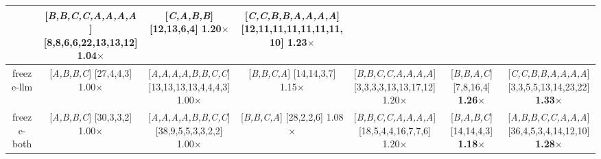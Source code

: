\begin{table}[htbp]
{\begin{tabular}{ccccccc}
    \rule{0pt}{20pt} & \makecell{[\textit{B,B,C,C,A,A,A,A}]\\{[8,8,6,6,22,13,13,12]}\\1.04$\times$}
    \rule{0pt}{20pt} & \makecell{[\textit{C,A,B,B}]\\{[12,13,6,4]}\\ \textbf{1.20$\times$}}
    \rule{0pt}{20pt} & \makecell{[\textit{C,C,B,B,A,A,A,A}]\\{[12,11,11,11,11,11,11,10]}\\ \textbf{1.23$\times$}} \\
    \hline
    freeze-llm
    \rule{0pt}{20pt} & \makecell{[\textit{A,B,B,C}]\\{[27,4,4,3]}\\1.00$\times$}
    \rule{0pt}{20pt} & \makecell{[\textit{A,A,A,A,B,B,C,C}]\\{[13,13,13,13,4,4,4,3]}\\1.00$\times$}
    \rule{0pt}{20pt} & \makecell{[\textit{B,B,C,A}]\\{[14,14,3,7]}\\1.15$\times$}
    \rule{0pt}{20pt} & \makecell{[\textit{B,B,C,C,A,A,A,A}]\\{[3,3,3,3,13,13,17,12]}\\1.20$\times$}
    \rule{0pt}{20pt} & \makecell{[\textit{B,B,A,C}]\\{[7,8,16,4]}\\ \textbf{1.26$\times$}}
    \rule{0pt}{20pt} & \makecell{[\textit{C,C,B,B,A,A,A,A}]\\{[3,3,5,5,13,14,23,22]}\\ \textbf{1.33$\times$}} \\
    \hline
    freeze-both
    \rule{0pt}{20pt} & \makecell{[\textit{A,B,B,C}]\\{[30,3,3,2]}\\1.00$\times$}
    \rule{0pt}{20pt} & \makecell{[\textit{A,A,A,A,B,B,C,C}]\\{[38,9,5,5,3,3,2,2]}\\1.00$\times$}
    \rule{0pt}{20pt} & \makecell{[\textit{B,B,C,A}]\\{[28,2,2,6]}\\1.08$\times$}
    \rule{0pt}{20pt} & \makecell{[\textit{B,B,C,C,A,A,A,A}]\\{[18,5,4,4,16,7,7,6]}\\1.20$\times$}
    \rule{0pt}{20pt} & \makecell{[\textit{B,A,B,C}]\\{[14,14,4,3]}\\ \textbf{1.18$\times$}}
    \rule{0pt}{20pt} & \makecell{[\textit{A,B,B,C,C,A,A,A}]\\{[36,4,5,3,4,14,12,10]}\\ \textbf{1.28$\times$}} \\
    \hline
  \end{tabular}}%
\end{table}

